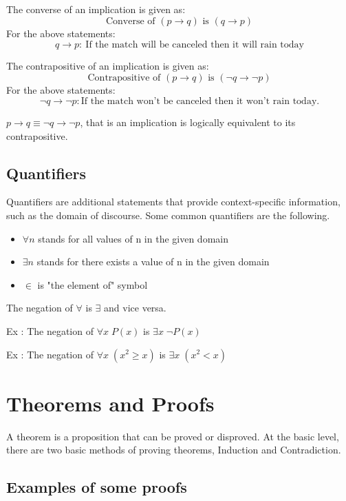 \documentclass[14pt]{extarticle}
\newcommand{\impl}{\xrightarrow{}}
\begin{document}
The converse of an implication is given as:
\[
    \text{Converse of } (p \impl q) \text{ is } (q \impl p)
\]
For the above statements:
\[
    q \impl p : \ \text{If the match will be canceled then it will rain today}
\]

The contrapositive of an implication is given as:
\[
    \text{Contrapositive of } (p \impl q) \text{ is } (\neg q \impl \neg p)
\]
For the above statements:
\[
    \neg q \impl \neg p : \text{If the match won't be canceled then it won't rain today.}
\]

$p \impl q \equiv \neg q \impl \neg p$, that is an implication is logically equivalent to its contrapositive.

\subsection{Quantifiers}

Quantifiers are additional statements that provide context-specific information, such as the domain of discourse. Some common quantifiers are the following.

\begin{itemize}
    \item $\forall n$ stands for all values of n in the given domain
    \item $\exists n$ stands for there exists a value of n in the given domain
    \item $\in$ is "the element of" symbol
\end{itemize}

The negation of $\forall$ is $\exists$ and vice versa.

Ex : The negation of $\forall x \; P(x)$ is $\exists x \; \neg P(x)$

Ex : The negation of $\forall x \; (x^2 \geq x)$ is $\exists x \; (x^2 < x)$

\newpage

\section{Theorems and Proofs}

A theorem is a proposition that can be proved or disproved. At the basic level, there are two basic methods of proving theorems, Induction and Contradiction.

\subsection{Examples of some proofs}
\end{document}
